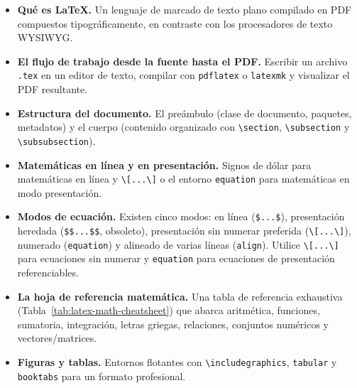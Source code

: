\begin{itemize}
    \item \textbf{Qué es \LaTeX{}.} Un lenguaje de marcado de texto
          plano compilado en PDF compuestos tipográficamente, en
          contraste con los procesadores de texto WYSIWYG.
    \item \textbf{El flujo de trabajo desde la fuente hasta el PDF.}
          Escribir un archivo \texttt{.tex} en un editor de texto,
          compilar con \texttt{pdflatex} o \texttt{latexmk} y
          visualizar el PDF resultante.
    \item \textbf{Estructura del documento.} El preámbulo (clase de
          documento, paquetes, metadatos) y el cuerpo (contenido
          organizado con \verb|\section|, \verb|\subsection| y
          \verb|\subsubsection|).
    \item \textbf{Matemáticas en línea y en presentación.} Signos de
          dólar para matemáticas en línea y \verb|\[...\]| o el
          entorno \texttt{equation} para matemáticas en modo
          presentación.
    \item \textbf{Modos de ecuación.} Existen cinco modos: en línea
          (\verb|$...$|), presentación heredada (\verb|$$...$$|,
          obsoleto), presentación sin numerar preferida
          (\verb|\[...\]|), numerado (\texttt{equation}) y alineado de
          varias líneas (\texttt{align}). Utilice \verb|\[...\]| para
          ecuaciones sin numerar y \texttt{equation} para ecuaciones
          de presentación referenciables.
    \item \textbf{La hoja de referencia matemática.} Una tabla de
          referencia exhaustiva (Tabla~\ref{tab:latex-math-cheatsheet})
          que abarca aritmética, funciones, sumatoria, integración,
          letras griegas, relaciones, conjuntos numéricos y
          vectores/matrices.
    \item \textbf{Figuras y tablas.} Entornos flotantes con
          \verb|\includegraphics|, \texttt{tabular} y
          \texttt{booktabs} para un formato profesional.

\end{itemize}
